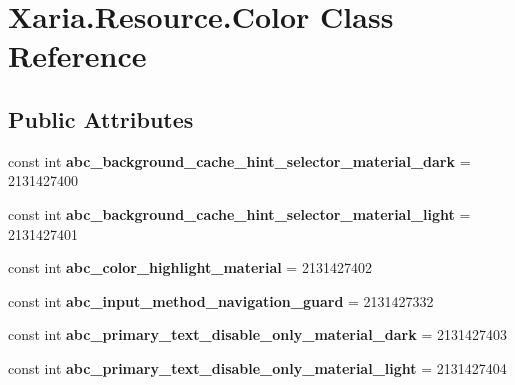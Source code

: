 \hypertarget{classXaria_1_1Resource_1_1Color}{}\section{Xaria.\+Resource.\+Color Class Reference}
\label{classXaria_1_1Resource_1_1Color}
\subsection*{Public Attributes}
\begin{DoxyCompactItemize}
\item 
\mbox{\label{classXaria_1_1Resource_1_1Color_aab2b56d5d43bffa4cc4d31b6e62db16a}} 
const int {\bfseries abc\+\_\+background\+\_\+cache\+\_\+hint\+\_\+selector\+\_\+material\+\_\+dark} = 2131427400
\item 
\mbox{\label{classXaria_1_1Resource_1_1Color_a2fa6e03e9999d62304ac22774d13a0fa}} 
const int {\bfseries abc\+\_\+background\+\_\+cache\+\_\+hint\+\_\+selector\+\_\+material\+\_\+light} = 2131427401
\item 
\mbox{\label{classXaria_1_1Resource_1_1Color_a4c9a10d43ff4474d3cb290d553f27e05}} 
const int {\bfseries abc\+\_\+color\+\_\+highlight\+\_\+material} = 2131427402
\item 
\mbox{\label{classXaria_1_1Resource_1_1Color_adbbdd5a697e29ec70148c3cfcd1ed2b5}} 
const int {\bfseries abc\+\_\+input\+\_\+method\+\_\+navigation\+\_\+guard} = 2131427332
\item 
\mbox{\label{classXaria_1_1Resource_1_1Color_af338187c2467acfc37206a58513eda92}} 
const int {\bfseries abc\+\_\+primary\+\_\+text\+\_\+disable\+\_\+only\+\_\+material\+\_\+dark} = 2131427403
\item 
\mbox{\label{classXaria_1_1Resource_1_1Color_ae608fed8802e91f7ba06fdf016f0d198}} 
const int {\bfseries abc\+\_\+primary\+\_\+text\+\_\+disable\+\_\+only\+\_\+material\+\_\+light} = 2131427404
\item 
\mbox{\label{classXaria_1_1Resource_1_1Color_a6a6bbd48705a2d9c0dfcd85fc5e171cd}} 

\end{DoxyCompactItemize}
